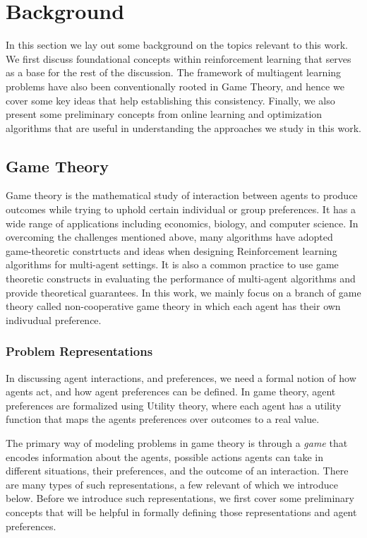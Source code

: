 \chapter{Background}
In this section we lay out some background on the topics relevant to this work.
We first discuss foundational concepts within reinforcement learning that serves as a base for the
rest of the discussion.
The framework of multiagent learning problems have also been conventionally rooted in Game Theory,
and hence we cover some key ideas that help establishing this consistency.
Finally, we also present some preliminary concepts from online learning and optimization algorithms
that are useful in understanding the approaches we study in this work.

\section{Game Theory}

Game theory is the mathematical study of interaction between agents to produce outcomes while
trying to uphold certain individual or group preferences.
It has a wide range of applications including economics, biology, and computer science.
In overcoming the challenges mentioned above, many algorithms have adopted game-theoretic
constrtucts and ideas when designing Reinforcement learning algorithms for multi-agent settings.
It is also a common practice to use game theoretic constructs in evaluating the performance of
multi-agent algorithms and provide theoretical guarantees.
In this work, we mainly focus on a branch of game theory called non-cooperative game theory in
which each agent has their own indivudual preference.

\subsection{Problem Representations}
\label{subsec:reps}

In discussing agent interactions, and preferences, we need a formal notion of how agents act, and
how agent preferences can be defined.
In game theory, agent preferences are formalized using Utility theory, where each agent has a
utility function that maps the agents preferences over outcomes to a real value.

The primary way of modeling problems in game theory is through a \textit{game} that encodes
information about the agents, possible actions agents can take in different situations, their
preferences, and the outcome of an interaction.
There are many types of such representations, a few relevant of which we introduce below.
Before we introduce such representations, we first cover some preliminary concepts that will be
helpful in formally defining those representations and agent preferences.

